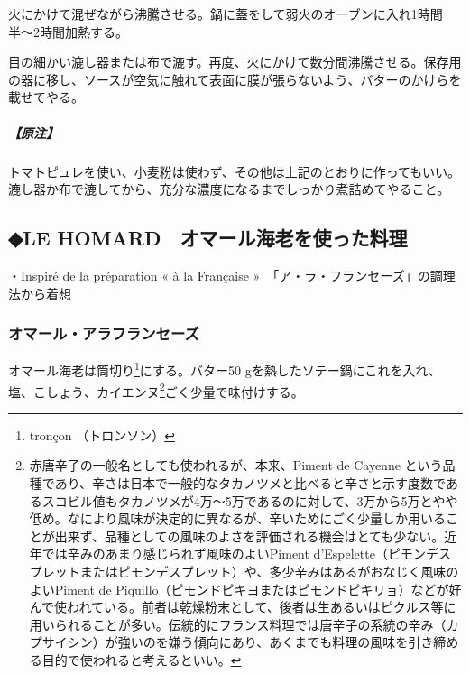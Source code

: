 火にかけて混ぜながら沸騰させる。鍋に蓋をして弱火のオーブンに入れ1時間半〜2時間加熱する。

目の細かい漉し器または布で漉す。再度、火にかけて数分間沸騰させる。保存用の器に移し、ソースが空気に触れて表面に膜が張らないよう、バターのかけらを載せてやる。

\hypertarget{nota-sauce-tomate}{%
\subparagraph{【原注】}\label{nota-sauce-tomate}}

トマトピュレを使い、小麦粉は使わず、その他は上記のとおりに作ってもいい。漉し器か布で漉してから、充分な濃度になるまでしっかり煮詰めてやること。


\hypertarget{le-homardux30aaux30deux30fcux30ebux6d77ux8001ux3092ux4f7fux3063ux305fux6599ux7406}{%
\subsection{◆LE
HOMARD　オマール海老を使った料理}\label{le-homardux30aaux30deux30fcux30ebux6d77ux8001ux3092ux4f7fux3063ux305fux6599ux7406}}

・Inspiré de la préparation « à la Française
»　「ア・ラ・フランセーズ」の調理法から着想

\hypertarget{homard-a-la-francaise}{%
\subsubsection{オマール・アラフランセーズ}\label{homard-a-la-francaise}}


オマール海老は筒切り\footnote{tronçon （トロンソン）}にする。バター50
gを熱したソテー鍋にこれを入れ、塩、こしょう、カイエンヌ\footnote{赤唐辛子の一般名としても使われるが、本来、Piment
  de Cayenne
  という品種であり、辛さは日本で一般的なタカノツメと比べると辛さと示す度数であるスコビル値もタカノツメが4万〜5万であるのに対して、3万から5万とやや低め。なにより風味が決定的に異なるが、辛いためにごく少量しか用いることが出来ず、品種としての風味のよさを評価される機会はとても少ない。近年では辛みのあまり感じられず風味のよいPiment
  d'Espelette（ピモンデスプレットまたはピモンデスプレット）や、多少辛みはあるがおなじく風味のよいPiment
  de
  Piquillo（ピモンドピキヨまたはピモンドピキリョ）などが好んで使われている。前者は乾燥粉末として、後者は生あるいはピクルス等に用いられることが多い。伝統的にフランス料理では唐辛子の系統の辛み（カプサイシン）が強いのを嫌う傾向にあり、あくまでも料理の風味を引き締める目的で使われると考えるといい。}ごく少量で味付けする。

